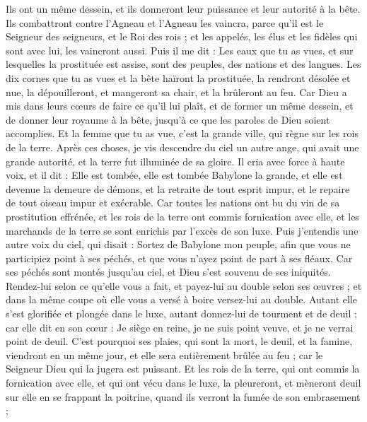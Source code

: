 \begin{multicols}{2}
Ils ont un même dessein, et ils donneront leur puissance et leur autorité à la bête.
Ils combattront contre l'Agneau et l'Agneau les vaincra, parce qu'il est le Seigneur des seigneurs, et le Roi des rois ; et les appelés, les élus et les fidèles qui sont avec lui, les vaincront aussi.
Puis il me dit : Les eaux que tu as vues, et sur lesquelles la prostituée est assise, sont des peuples, des nations et des langues.
Les dix cornes que tu as vues et la bête haïront la prostituée, la rendront désolée et nue, la dépouilleront, et mangeront sa chair, et la brûleront au feu.
Car Dieu a mis dans leurs cœurs de faire ce qu'il lui plaît, et de former un même dessein, et de donner leur royaume à la bête, jusqu'à ce que les paroles de Dieu soient accomplies.
Et la femme que tu as vue, c'est la grande ville, qui règne sur les rois de la terre.
\VerseOne{}Après ces choses, je vis descendre du ciel un autre ange, qui avait une grande autorité, et la terre fut illuminée de sa gloire.
Il cria avec force à haute voix, et il dit : Elle est tombée, elle est tombée Babylone la grande, et elle est devenue la demeure de démons, et la retraite de tout esprit impur, et le repaire de tout oiseau impur et exécrable.
Car toutes les nations ont bu du vin de sa prostitution effrénée, et les rois de la terre ont commis fornication avec elle, et les marchands de la terre se sont enrichis par l'excès de son luxe.
Puis j'entendis une autre voix du ciel, qui disait : Sortez de Babylone mon peuple, afin que vous ne participiez point à ses péchés, et que vous n'ayez point de part à ses fléaux.
Car ses péchés sont montés jusqu'au ciel, et Dieu s'est souvenu de ses iniquités.
Rendez-lui selon ce qu'elle vous a fait, et payez-lui au double selon ses œuvres ; et dans la même coupe où elle vous a versé à boire versez-lui au double.
Autant elle s'est glorifiée et plongée dans le luxe, autant donnez-lui de tourment et de deuil ; car elle dit en son cœur : Je siège en reine, je ne suis point veuve, et je ne verrai point de deuil.
C'est pourquoi ses plaies, qui sont la mort, le deuil, et la famine, viendront en un même jour, et elle sera entièrement brûlée au feu ; car le Seigneur Dieu qui la jugera est puissant.
Et les rois de la terre, qui ont commis la fornication avec elle, et qui ont vécu dans le luxe, la pleureront, et mèneront deuil sur elle en se frappant la poitrine, quand ils verront la fumée de son embrasement ;

\end{multicols}
